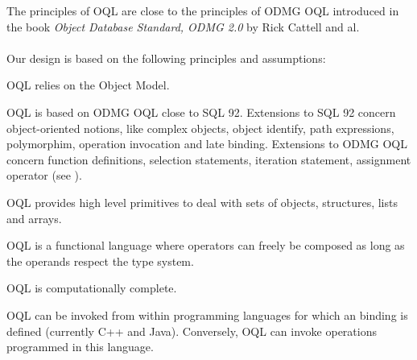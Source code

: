\label{principles}
The principles of OQL are close to the principles of ODMG OQL introduced
in the book \emph{Object Database Standard, ODMG 2.0} by Rick Cattell and al.
\\
\\
Our design is based on the following principles and assumptions:
\bi
\item OQL relies on the \eyedb Object Model.
\item OQL is based on ODMG OQL close to SQL 92. Extensions to SQL 92
concern object-oriented notions, like complex objects, object identify,
path expressions, polymorphim, operation invocation and late binding.
Extensions to ODMG OQL concern function definitions, selection statements,
iteration statement, assignment operator (see ).
\item OQL provides high level primitives to deal with sets of objects,
structures, lists and arrays.
\item OQL is a functional language where operators can freely be composed as
long as the operands respect the type system.
\item OQL is computationally complete.
\item OQL can be invoked from within programming languages for which an
\eyedb binding is defined (currently C++ and Java).
Conversely, OQL can invoke operations programmed in this language.
\ei

